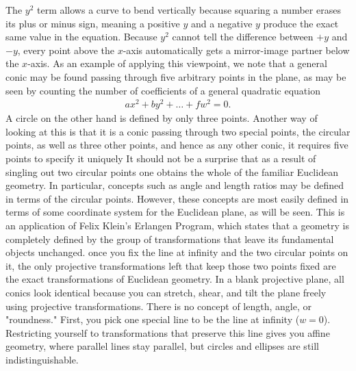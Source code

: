 \documentclass{report}
\begin{document}
\begin{itemize}
            \bigbreak \noindent 
            The \(y^{2}\) term allows a curve to bend vertically because squaring a number erases its plus or minus sign, meaning a positive \(y\) and a negative \(y\) produce the exact same value in the equation.
            \bigbreak \noindent 
            Because \(y^{2}\) cannot tell the difference between \(+y\) and \(-y\), every point above the \(x\)-axis automatically gets a mirror-image partner below the \(x\)-axis.
            \bigbreak \noindent 
            As an example of applying this viewpoint, we note that a general conic may be found passing through five arbitrary points in the plane, as may be seen by counting the number of coefficients of a general quadratic equation
            \begin{align*}
                ax^{2} + by^{2} + \dots + fw^{2} = 0
            .\end{align*}
            A circle on the other hand is defined by only three points. Another way of looking at this is that it is a conic passing through two special points, the circular points, as well as three other points, and hence as any other conic, it requires five points to specify it uniquely
            \bigbreak \noindent 
            It should not be a surprise that as a result of singling out two circular points one obtains the whole of the familiar Euclidean geometry. In particular, concepts such as angle and length ratios may be defined in terms of the circular points. However, these concepts are most easily defined in terms of some coordinate system for the Euclidean plane, as will be seen.
            \bigbreak \noindent 
            This is an application of Felix Klein’s Erlangen Program, which states that a geometry is completely defined by the group of transformations that leave its fundamental objects unchanged.
            \bigbreak \noindent 
            once you fix the line at infinity and the two circular points on it, the only projective transformations left that keep those two points fixed are the exact transformations of Euclidean geometry.
            \bigbreak \noindent 
            In a blank projective plane, all conics look identical because you can stretch, shear, and tilt the plane freely using projective transformations. There is no concept of length, angle, or "roundness."
            \bigbreak \noindent 
            First, you pick one special line to be the line at infinity (\(w = 0\)). Restricting yourself to transformations that preserve this line gives you affine geometry, where parallel lines stay parallel, but circles and ellipses are still indistinguishable.

\end{itemize}
\end{document}
